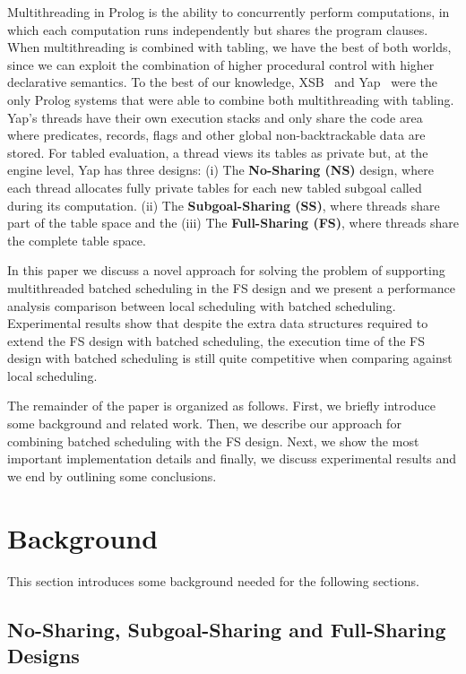 \documentclass{llncs}
\begin{document}
Multithreading in Prolog is the ability to concurrently perform
computations, in which each computation runs independently but shares
the program clauses. When multithreading is combined with tabling, we
have the best of both worlds, since we can exploit the combination of
higher procedural control with higher declarative semantics. To the
best of our knowledge, XSB~\cite{Marques-08} and Yap~\cite{Areias-12a}
were the only Prolog systems that were able to combine both
multithreading with tabling. Yap's threads have their own execution
stacks and only share the code area where predicates, records, flags
and other global non-backtrackable data are stored. For tabled
evaluation, a thread views its tables as private but, at the engine
level, Yap has three designs: (i) The {\bf No-Sharing (NS)} design,
where each thread allocates fully private tables for each new tabled
subgoal called during its computation. (ii) The {\bf Subgoal-Sharing
  (SS)}, where threads share part of the table space and the (iii) The
{\bf Full-Sharing (FS)}, where threads share the complete table space.

In this paper we discuss a novel approach for solving the problem of
supporting multithreaded batched scheduling in the FS design and we
present a performance analysis comparison between local scheduling
with batched scheduling. Experimental results show that despite the
extra data structures required to extend the FS design with batched
scheduling, the execution time of the FS design with batched
scheduling is still quite competitive when comparing against local
scheduling.

The remainder of the paper is organized as follows. First, we briefly
introduce some background and related work. Then, we describe our
approach for combining batched scheduling with the FS design. Next, we
show the most important implementation details and finally, we discuss
experimental results and we end by outlining some conclusions.

\section{Background}

This section introduces some background needed for the following
sections. 

\subsection{No-Sharing, Subgoal-Sharing and Full-Sharing Designs}
\end{document}
